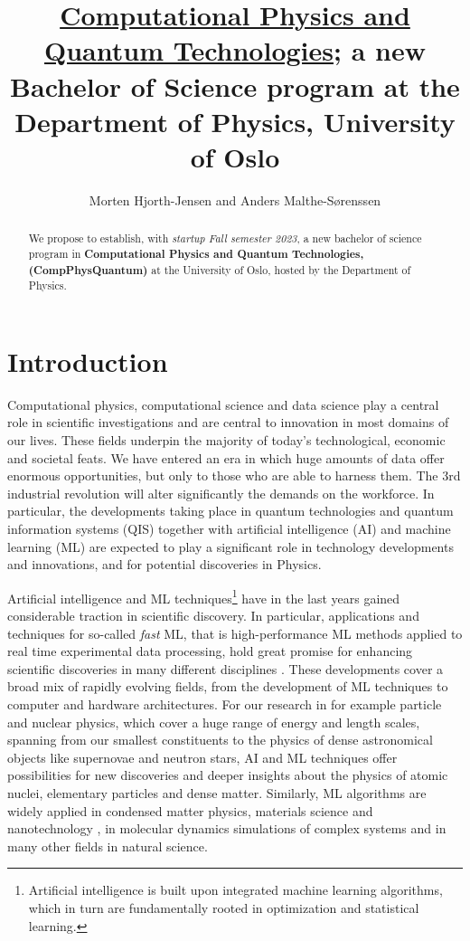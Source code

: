 \documentclass[aps,rmp,preprint,amsmath,amssymb,graphicx,longbibliography]{revtex4-1}
\begin{document}
\title{\underline{Computational Physics and Quantum Technologies}; a new Bachelor of Science program  at the Department of Physics, University of Oslo}

\author{Morten Hjorth-Jensen and Anders Malthe-Sørenssen}


\begin{abstract}
We propose to establish, with {\em startup Fall semester 2023}, a new bachelor of science  program in {\bf Computational Physics and Quantum Technologies, (CompPhysQuantum)}  at the University of Oslo, hosted by the Department of Physics. 
\end{abstract}
\maketitle
\section{Introduction}

Computational physics, computational science  and data science play a central role in scientific investigations and are central to innovation in most domains of our lives. These fields underpin the majority of today's technological, economic and societal feats. We have entered an era in which huge amounts of data offer enormous opportunities, but only to those who are able to harness them. The 3rd industrial revolution will alter significantly the demands on the workforce. In particular, the developments taking place in quantum technologies and quantum information systems (QIS) together with artificial intelligence (AI) and machine learning (ML) are expected to play a significant role in technology developments and innovations, and for potential discoveries in Physics.

Artificial intelligence and ML techniques\footnote{Artificial intelligence is built upon integrated machine learning algorithms, which in turn are fundamentally rooted in optimization and statistical learning.} have in the last years gained considerable traction in scientific discovery. In particular, applications and techniques for so-called {\em fast} ML, that is high-performance ML methods applied to real time experimental data processing, hold great promise for enhancing scientific discoveries in many different disciplines \cite{deiana2021}. 
These developments cover a broad mix of rapidly evolving  fields, from the development of ML techniques to computer and hardware architectures. For our research in for example particle and nuclear physics, which cover a huge range of energy and length scales, spanning from our smallest constituents to the physics of dense astronomical objects like supernovae and neutron stars, AI and ML techniques offer possibilities for new discoveries and deeper insights about the physics of atomic nuclei, elementary particles and dense matter. Similarly, ML algorithms are widely applied  in condensed matter physics, materials science and nanotechnology \cite{Schleder2019}, in molecular dynamics simulations of complex systems  and in many other  fields in natural science.
\end{document}
